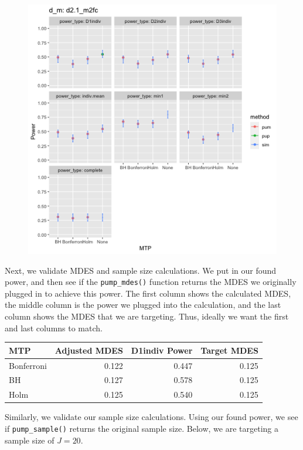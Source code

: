 \documentclass[
]{article}
\begin{document}
\begin{figure}
  \includegraphics[width=\linewidth]{example_validation_plot.png}
\end{figure}

Next, we validate MDES and sample size calculations. We put in our found
power, and then see if the \texttt{pump\_mdes()} function returns the
MDES we originally plugged in to achieve this power. The first column
shows the calculated MDES, the middle column is the power we plugged
into the calculation, and the last column shows the MDES that we are
targeting. Thus, ideally we want the first and last columns to match.

\begin{tabular}{l|r|r|r}
\hline
MTP & Adjusted MDES & D1indiv Power & Target MDES\\
\hline
Bonferroni & 0.122 & 0.447 & 0.125\\
\hline
BH & 0.127 & 0.578 & 0.125\\
\hline
Holm & 0.125 & 0.540 & 0.125\\
\hline
\end{tabular}

Similarly, we validate our sample size calculations. Using our found
power, we see if \texttt{pump\_sample()} returns the original sample
size. Below, we are targeting a sample size of \(J = 20\).
\end{document}
